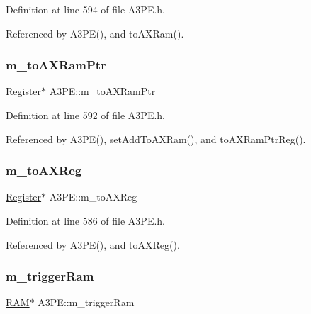 Definition at line 594 of file A3\+P\+E.\+h.



Referenced by A3\+P\+E(), and to\+A\+X\+Ram().

\mbox{\label{classA3PE_aae1b8b2e96bba94535bd4de766bd7e65}} 
\subsubsection{\texorpdfstring{m\+\_\+to\+A\+X\+Ram\+Ptr}{m\_toAXRamPtr}}
{\footnotesize\ttfamily \hyperlink{classRegister}{Register}$\ast$ A3\+P\+E\+::m\+\_\+to\+A\+X\+Ram\+Ptr\hspace{0.3cm}{\ttfamily [private]}}



Definition at line 592 of file A3\+P\+E.\+h.



Referenced by A3\+P\+E(), set\+Add\+To\+A\+X\+Ram(), and to\+A\+X\+Ram\+Ptr\+Reg().

\mbox{\label{classA3PE_abe8eb76e3c0d967403726143deb1b70f}} 
\subsubsection{\texorpdfstring{m\+\_\+to\+A\+X\+Reg}{m\_toAXReg}}
{\footnotesize\ttfamily \hyperlink{classRegister}{Register}$\ast$ A3\+P\+E\+::m\+\_\+to\+A\+X\+Reg\hspace{0.3cm}{\ttfamily [private]}}



Definition at line 586 of file A3\+P\+E.\+h.



Referenced by A3\+P\+E(), and to\+A\+X\+Reg().

\mbox{\label{classA3PE_a2b40e3937f0aa008ec7073acc5029fcc}} 
\subsubsection{\texorpdfstring{m\+\_\+trigger\+Ram}{m\_triggerRam}}
{\footnotesize\ttfamily \hyperlink{classRAM}{R\+AM}$\ast$ A3\+P\+E\+::m\+\_\+trigger\+Ram\hspace{0.3cm}{\ttfamily [private]}}



